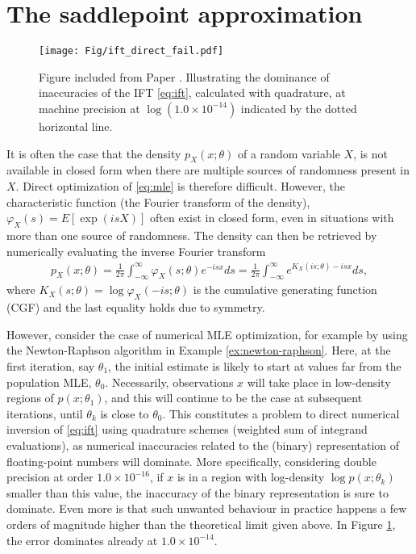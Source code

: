 \section{The saddlepoint approximation}
\begin{figure}[t!]
	\centering
	\texttt{[image: Fig/ift\_direct\_fail.pdf]}
	\caption{
	\label{fig:ift-direct-fail}
	Figure included from Paper . Illustrating the dominance of inaccuracies of the IFT \eqref{eq:ift}, calculated with quadrature, at machine precision at $\log(1.0\times 10^{-14})$ indicated by the dotted horizontal line.
	}
\end{figure}
It is often the case that the density $p_X(x;\theta)$ of a random variable $X$, is not available in closed form when there are multiple sources of randomness present in $X$.
Direct optimization of \eqref{eq:mle} is therefore difficult.
However, the characteristic function (the Fourier transform of the density), $\varphi_X(s)=E[\exp(isX)]$ often exist in closed form, even in situations with more than one source of randomness.
The density can then be retrieved by numerically evaluating the inverse Fourier transform
\begin{align}\label{eq:ift}
	p_X(x;\theta) = \frac{1}{2\pi} \int_{-\infty}^{\infty} \varphi_X(s;\theta)e^{-isx} ds
	= \frac{1}{2\pi} \int_{-\infty}^{\infty} e^{K_X(is;\theta)-isx} ds,
\end{align}
where $K_X(s;\theta)=\log\varphi_X(-is;\theta)$ is the cumulative generating function (CGF) and the last equality holds due to symmetry.

However, consider the case of numerical MLE optimization, for example by using the Newton-Raphson algorithm in Example \ref{ex:newton-raphson}. 
Here, at the first iteration, say $\theta_1$, the initial estimate is likely to start at values far from the population MLE, $\theta_0$.
Necessarily, observations $x$ will take place in low-density regions of $p(x;\theta_1)$, and this will continue to be the case at subsequent iterations, until $\theta_k$ is close to $\theta_0$.
This constitutes a problem to direct numerical inversion of \eqref{eq:ift} using quadrature schemes (weighted sum of integrand evaluations), as numerical inaccuracies related to the (binary) representation of floating-point numbers will dominate.
More specifically, considering double precision at order $1.0\times 10^{-16}$, if $x$ is in a region with log-density $\log p(x;\theta_k)$ smaller than this value, the inaccuracy of the binary representation is sure to dominate. Even more is that such unwanted behaviour in practice happens a few orders of magnitude higher than the theoretical limit given above. In Figure \ref{fig:ift-direct-fail}, the error dominates already at $1.0\times 10^{-14}$.

